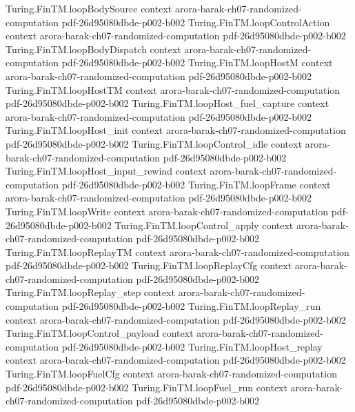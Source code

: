 \begin{theorem}
\proofstep
  {Turing.FinTM.loopBodySource}
  {context}
  {arora-barak-ch07-randomized-computation}
  {pdf-26d95080dbde-p002-b002}
\proofstep
  {Turing.FinTM.loopControlAction}
  {context}
  {arora-barak-ch07-randomized-computation}
  {pdf-26d95080dbde-p002-b002}
\proofstep
  {Turing.FinTM.loopBodyDispatch}
  {context}
  {arora-barak-ch07-randomized-computation}
  {pdf-26d95080dbde-p002-b002}
\proofstep
  {Turing.FinTM.loopHostM}
  {context}
  {arora-barak-ch07-randomized-computation}
  {pdf-26d95080dbde-p002-b002}
\proofstep
  {Turing.FinTM.loopHostTM}
  {context}
  {arora-barak-ch07-randomized-computation}
  {pdf-26d95080dbde-p002-b002}
\proofstep
  {Turing.FinTM.loopHost_fuel_capture}
  {context}
  {arora-barak-ch07-randomized-computation}
  {pdf-26d95080dbde-p002-b002}
\proofstep
  {Turing.FinTM.loopHost_init}
  {context}
  {arora-barak-ch07-randomized-computation}
  {pdf-26d95080dbde-p002-b002}
\proofstep
  {Turing.FinTM.loopControl_idle}
  {context}
  {arora-barak-ch07-randomized-computation}
  {pdf-26d95080dbde-p002-b002}
\proofstep
  {Turing.FinTM.loopHost_input_rewind}
  {context}
  {arora-barak-ch07-randomized-computation}
  {pdf-26d95080dbde-p002-b002}
\proofstep
  {Turing.FinTM.loopFrame}
  {context}
  {arora-barak-ch07-randomized-computation}
  {pdf-26d95080dbde-p002-b002}
\proofstep
  {Turing.FinTM.loopWrite}
  {context}
  {arora-barak-ch07-randomized-computation}
  {pdf-26d95080dbde-p002-b002}
\proofstep
  {Turing.FinTM.loopControl_apply}
  {context}
  {arora-barak-ch07-randomized-computation}
  {pdf-26d95080dbde-p002-b002}
\proofstep
  {Turing.FinTM.loopReplayTM}
  {context}
  {arora-barak-ch07-randomized-computation}
  {pdf-26d95080dbde-p002-b002}
\proofstep
  {Turing.FinTM.loopReplayCfg}
  {context}
  {arora-barak-ch07-randomized-computation}
  {pdf-26d95080dbde-p002-b002}
\proofstep
  {Turing.FinTM.loopReplay_step}
  {context}
  {arora-barak-ch07-randomized-computation}
  {pdf-26d95080dbde-p002-b002}
\proofstep
  {Turing.FinTM.loopReplay_run}
  {context}
  {arora-barak-ch07-randomized-computation}
  {pdf-26d95080dbde-p002-b002}
\proofstep
  {Turing.FinTM.loopControl_payload}
  {context}
  {arora-barak-ch07-randomized-computation}
  {pdf-26d95080dbde-p002-b002}
\proofstep
  {Turing.FinTM.loopHost_replay}
  {context}
  {arora-barak-ch07-randomized-computation}
  {pdf-26d95080dbde-p002-b002}
\proofstep
  {Turing.FinTM.loopFuelCfg}
  {context}
  {arora-barak-ch07-randomized-computation}
  {pdf-26d95080dbde-p002-b002}
\proofstep
  {Turing.FinTM.loopFuel_run}
  {context}
  {arora-barak-ch07-randomized-computation}
  {pdf-26d95080dbde-p002-b002}

\end{theorem}
